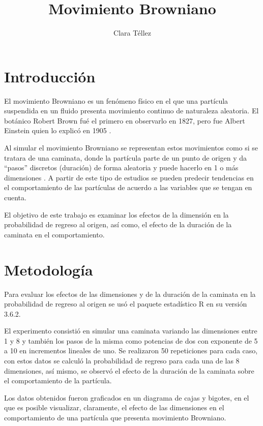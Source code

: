 ﻿\documentclass{article}
\begin{document}
\title{\textbf{Movimiento Browniano}}
\author{Clara T\'ellez}
\maketitle

\section{Introducci\'on}\label{intro}

El movimiento Browniano es un fen\'omeno f\'isico en el que una part\'icula suspendida en un fluido presenta movimiento continuo de naturaleza aleatoria.  El bot\'anico Robert Brown fu\'e el primero en observarlo en 1827, pero fue Albert Einstein quien lo explic\'o en 1905 \cite{Baz}.  

Al simular el movimiento Browniano se representan estos movimientos como si se tratara de una caminata, donde la part\'icula parte de un punto de origen y da ``pasos'' discretos (duraci\'on) de forma aleatoria y puede hacerlo en 1 o m\'as dimensiones \cite{Eli}.  A partir de este tipo de estudios se pueden predecir tendencias en el comportamiento de las part\'iculas de acuerdo a las variables que se tengan en cuenta. 

El objetivo de este trabajo es examinar los efectos de la dimensi\'on  en la probabilidad de regreso al origen, as\'i como, el efecto de la duraci\'on de la caminata en el comportamiento.

\section{Metodolog\'ia}\label{met}

Para evaluar los efectos de las dimensiones y de la duraci\'on de la caminata en la probabilidad de regreso al origen se us\'o el paquete estad\'istico R en su versi\'on 3.6.2.  

El experimento consisti\'o en simular una caminata variando las dimensiones entre 1 y 8 y tambi\'en los pasos de la misma  como potencias de dos con exponente de 5 a 10 en incrementos lineales de uno.  Se realizaron 50 repeticiones para cada caso, con estos datos se calcul\'o la probabilidad de regreso para cada una de las 8 dimensiones, as\'i mismo, se observ\'o el efecto de la duraci\'on de la caminata sobre el comportamiento de la part\'icula.

Los datos obtenidos fueron graficados en un diagrama de cajas y bigotes, en el que es posible visualizar, claramente, el efecto de las dimensiones en el comportamiento de una part\'icula que presenta movimiento Browniano.
\end{document}
